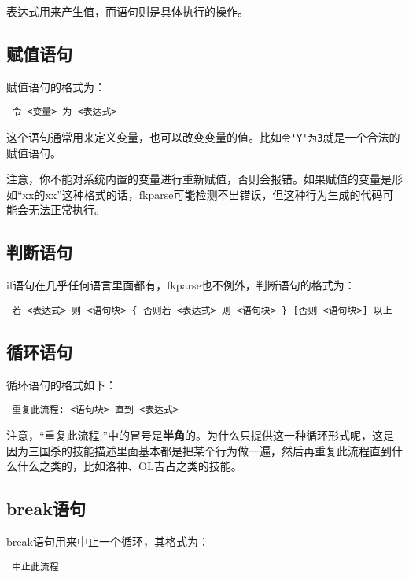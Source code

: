 表达式用来产生值，而语句则是具体执行的操作。

\subsection{赋值语句}

赋值语句的格式为：

\begin{verbatim}
 令 <变量> 为 <表达式>
\end{verbatim}

这个语句通常用来定义变量，也可以改变变量的值。比如\verb|令'Y'为3|就是一个合法的赋值语句。

注意，你不能对系统内置的变量进行重新赋值，否则会报错。如果赋值的变量是形如“xx的xx”这种格式的话，fkparse可能检测不出错误，但这种行为生成的代码可能会无法正常执行。

\subsection{判断语句}

if语句在几乎任何语言里面都有，fkparse也不例外，判断语句的格式为：

\begin{verbatim}
 若 <表达式> 则 <语句块> { 否则若 <表达式> 则 <语句块> } [否则 <语句块>] 以上
\end{verbatim}

\subsection{循环语句}

循环语句的格式如下：

\begin{verbatim}
 重复此流程: <语句块> 直到 <表达式>
\end{verbatim}

注意，“重复此流程:”中的冒号是\textbf{半角}的。为什么只提供这一种循环形式呢，这是因为三国杀的技能描述里面基本都是把某个行为做一遍，然后再重复此流程直到什么什么之类的，比如洛神、OL吉占之类的技能。

\subsection{break语句}

break语句用来中止一个循环，其格式为：

\begin{verbatim}
 中止此流程
\end{verbatim}

